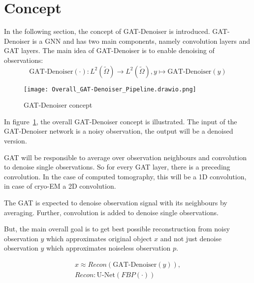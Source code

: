 \section{Concept}


In the following section, the concept of GAT-Denoiser is introduced. 
GAT-Denoiser is a GNN and has two main components, namely convolution layers and GAT layers.
The main idea of GAT-Denoiser is to enable denoising of observations:
\begin{equation}
  \text{GAT-Denoiser} (\cdot) : L^2(\tilde{\Omega}) \to  L^2(\tilde{\Omega}) , y \mapsto \text{GAT-Denoiser} (y) 
\end{equation}


\begin{figure}[H]
  \centering
  \label{fig:overall-concept}
  \texttt{[image: Overall\_GAT-Denoiser\_Pipeline.drawio.png]}
  \caption{GAT-Denoiser concept}
\end{figure}

In figure~\ref{fig:overall-concept}, the overall GAT-Denoiser concept is illustrated.
The input of the GAT-Denoiser network is a noisy observation, the output will be a denoised version.

GAT will be responsible to average over observation neighbours and convolution to denoise single observations. 
So for every GAT layer, there is a preceding convolution. 
In the case of computed tomography, this will be a 1D convolution, in case of cryo-EM a 2D convolution.

\begin{tcolorbox}[colback=red!5!white,colframe=red!75!black]
  The GAT is expected to denoise observation signal with its neighbours by averaging. 
  Further, convolution is added to denoise single observations.
\end{tcolorbox}


But, the main overall goal is to get best possible reconstruction 
from noisy observation $y$ which approximates original object $x$ and 
not just denoise observation $y$ which approximates noiseless observation $p$.


\begin{equation}
  \begin{aligned}
    x \approx   Recon \left( \text{GAT-Denoiser} \left( y \right) \right), \\
    Recon : \text{U-Net} \left( FBP \left( \cdot \right) \right)  
  \end{aligned}
\end{equation}

